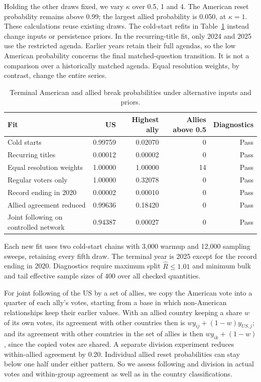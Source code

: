 \documentclass[10pt,authoryear]{elsarticle}
\begin{document}
Holding the other draws fixed, we vary $\kappa$ over 0.5, 1 and 4. The American reset probability remains above 0.99; the largest allied probability is 0.050, at $\kappa=1$. These calculations reuse existing draws. The cold-start refits in Table~\ref{tab:variant_summaries} instead change inputs or persistence priors. In the recurring-title fit, only 2024 and 2025 use the restricted agenda. Earlier years retain their full agendas, so the low American probability concerns the final matched-question transition. It is not a comparison over a historically matched agenda. Equal resolution weights, by contrast, change the entire series.

\begin{table}[ht]
\centering\small
\caption{Terminal American and allied break probabilities under alternative inputs and priors.}
\label{tab:variant_summaries}
\begin{tabularx}{\textwidth}{>{\raggedright\arraybackslash}Xrrrr}\toprule
Fit & US & Highest ally & Allies above 0.5 & Diagnostics\\\midrule
Cold starts & 0.99759 & 0.02070 & 0 & Pass\\
Recurring titles & 0.00012 & 0.00002 & 0 & Pass\\
Equal resolution weights & 1.00000 & 1.00000 & 14 & Pass\\
Regular voters only & 1.00000 & 0.32078 & 0 & Pass\\
Record ending in 2020 & 0.00002 & 0.00010 & 0 & Pass\\
Allied agreement reduced & 0.99636 & 0.18420 & 0 & Pass\\
Joint following on controlled network & 0.94387 & 0.00027 & 0 & Pass\\
\bottomrule
\end{tabularx}
\begin{minipage}{\textwidth}\footnotesize Each new fit uses two cold-start chains with 3,000 warmup and 12,000 sampling sweeps, retaining every fifth draw. The terminal year is 2025 except for the record ending in 2020. Diagnostics require maximum split $\widehat R\leq1.01$ and minimum bulk and tail effective sample sizes of 400 over all checked quantities.\end{minipage}
\end{table}

For joint following of the US by a set of allies, we copy the American vote into a quarter of each ally’s votes, starting from a base in which non-American relationships keep their earlier values. With an allied country keeping a share $w$ of its own votes, its agreement with other countries then is $w y_{ij}+(1-w)y_{US,j}$; and its agreement with other countries in the set of allies is then $w y_{ik}+(1-w)$, since the copied votes are shared. A separate division experiment reduces within-allied agreement by 0.20. Individual allied reset probabilities can stay below one half under either pattern. So we assess following and division in actual votes and within-group agreement as well as in the country classifications.
\end{document}
